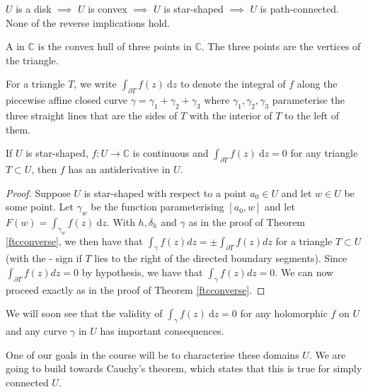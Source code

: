 \documentclass[egregdoesnotlikesansseriftitles,a4paper]{scrartcl}
\begin{document}
\begin{remark}
      $U$ is a disk $\implies $ $U$ is convex $\implies $ $U$ is star-shaped $\implies $ $U$ is path-connected. None of the reverse implications hold.
      \begin{figure}[H]
           \centering
      \end{figure}
      
\end{remark}
\begin{definition*}[Triangle]
      A  in $\mathbb{C}$ is the convex hull of three points in $\mathbb{C}$. The three points are the vertices of the triangle.
\end{definition*}
\begin{notation}
     For a triangle $T$, we write $\int_{\partial T}^{}f (z) \ \mathrm{d}z $ to denote the integral of $f$ along the piecewise affine closed curve $\gamma=\gamma_1 +\gamma_2 +\gamma_3 $ where $\gamma_1 , \gamma_2 , \gamma_3 $ parameterise the three straight lines that are the sides of $T$ with the interior of $T$ to the left of them.
\end{notation}
\begin{corollary}\label{starantideriv}
      If $U$ is star-shaped, $f: U \rightarrow \mathbb{C}$ is continuous and $\int_{\partial T}^{}f (z) \ \mathrm{d}z =0$ for any triangle $T \subset U$, then $f$ has an antiderivative in $U$.
\end{corollary}
\begin{proof}
      Suppose $U$ is star-shaped with respect to a point $a_0 \in U$ and let $w \in U$ be some point. Let $\gamma_{w}$ be the function parameterising $[a_0 ,w]$ and let $F (w)=\int_{\gamma_{w}}^{}f (z) \ \mathrm{d}z .$ With $h, \delta_{h}$ and $\gamma$ as in the proof of Theorem \ref{ftcconverse}, we then have that $\int_{\gamma} f(z) d z=\pm \int_{\partial T} f(z) d z$ for a triangle $T \subset U$ (with the - sign if $T$ lies to the right of the directed boundary segments).
      Since $\int_{\partial T} f(z) d z=0$ by hypothesis, we have that $\int_{\gamma} f(z) d z=0$. We can now proceed exactly as in the proof of Theorem \ref{ftcconverse}.
\end{proof}
We will soon see that the validity of $\int_{\gamma}^{}f (z) \ \mathrm{d}z=0 $ for any holomorphic $f$ on $U$ and any curve $\gamma$ in $U$ has important consequences.

One of our goals in the course will be to characterise these domains $U$. We are going to build towards Cauchy's theorem, which states that this is true for simply connected $U$.
\end{document}
